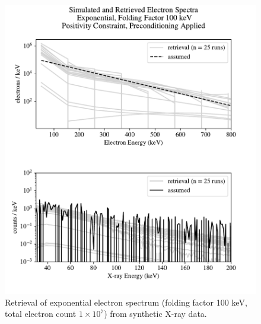 \begin{figure}[p]
    \centering
    \includegraphics[width=\textwidth]{figures/chapter_4/synthetic_data_examples/exponential_folding_100keV_posonly_preconditioning_1e7_particles}
    \caption{Retrieval of exponential electron spectrum (folding factor 100 keV, total electron count $1\times10^7$) from synthetic X-ray data.}
    \label{why_non_negative_is_good}
\end{figure}

